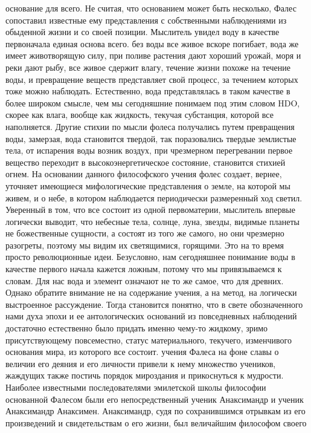 основание для всего. Не считая, что основанием может быть несколько, Фалес
сопоставил известные ему представления с собственными наблюдениями из обыденной
жизни и со своей позиции. Мыслитель увидел воду в качестве первоначала единая
основа всего. без воды все живое вскоре погибает, вода же имеет животворящую
силу, при поливе растения дают хороший урожай, моря и реки дают рыбу, все живое
сдержит влагу, течение жизни похоже на течение воды, и превращение веществ
представляет свой процесс, за течением которых тоже можно наблюдать.
Естественно, вода представлялась в таком качестве в более широком смысле, чем мы
сегодняшние понимаем под этим словом HDO, скорее как влага, вообще как жидкость,
текучая субстанция, которой все наполняется. Другие стихии по мысли фолеса
получались путем превращения воды, замерзая, вода становится твердой, так
поразовались твердые землистые тела, от испарения воды возник воздух, при
чрезмерном перегревании первое вещество переходит в высокоэнергетическое
состояние, становится стихией огнем. На основании данного философского учения
фолес создает, вернее, уточняет имеющиеся мифологические представления о земле,
на которой мы живем, и о небе, в котором наблюдается периодически размеренный
ход светил. Уверенный в том, что все состоит из одной первоматерии, мыслитель
впервые логически выводит, что небесные тела, солнце, луна, звезды, видимые
планеты не божественные сущности, а состоят из того же самого, но они чрезмерно
разогреты, поэтому мы видим их светящимися, горящими. Это на то время просто
революционные идеи. Безусловно, нам сегодняшнее понимание воды в качестве
первого начала кажется ложным, потому что мы привязываемся к словам. Для нас
вода и элемент означают не то же самое, что для древних. Однако обратите
внимание не на содержание учения, а на метод, на логически выстроенное
рассуждение. Тогда становится понятно, что в свете обозначенного нами духа эпохи
и ее антологических оснований из повседневных наблюдений достаточно естественно
было придать именно чему-то жидкому, зримо присутствующему повсеместно, статус
материального, текучего, изменчивого основания мира, из которого все состоит.
учения Фалеса на фоне славы о величии его деяния и его личности привели к нему
множество учеников, жаждущих также постичь порядок мироздания и прикоснуться к
мудрости. Наиболее известными последователями эмилетской школы философии
основанной Фалесом были его непосредственный ученик Анаксимандр и ученик
Анаксимандр Анаксимен. Анаксимандр, судя по сохранившимся отрывкам из его
произведений и свидетельствам о его жизни, был величайшим философом своего
